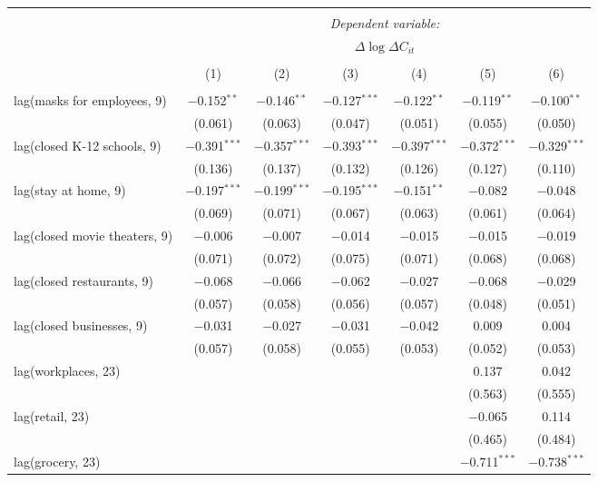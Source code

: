 \begin{tabular}{@{\extracolsep{1pt}}lcccccc} 
\\[-1.8ex]\hline 
\hline \\[-1.8ex] 
 & \multicolumn{6}{c}{\textit{Dependent variable:}} \\ 
\cline{2-7} 
 & \multicolumn{6}{c}{$\Delta \log \Delta C_{it}$} \\ 
\\[-1.8ex] & (1) & (2) & (3) & (4) & (5) & (6)\\ 
\hline \\[-1.8ex] 
 lag(masks for employees, 9) & $-$0.152$^{**}$ & $-$0.146$^{**}$ & $-$0.127$^{***}$ & $-$0.122$^{**}$ & $-$0.119$^{**}$ & $-$0.100$^{**}$ \\ 
  & (0.061) & (0.063) & (0.047) & (0.051) & (0.055) & (0.050) \\ 
  lag(closed K-12 schools, 9) & $-$0.391$^{***}$ & $-$0.357$^{***}$ & $-$0.393$^{***}$ & $-$0.397$^{***}$ & $-$0.372$^{***}$ & $-$0.329$^{***}$ \\ 
  & (0.136) & (0.137) & (0.132) & (0.126) & (0.127) & (0.110) \\ 
  lag(stay at home, 9) & $-$0.197$^{***}$ & $-$0.199$^{***}$ & $-$0.195$^{***}$ & $-$0.151$^{**}$ & $-$0.082 & $-$0.048 \\ 
  & (0.069) & (0.071) & (0.067) & (0.063) & (0.061) & (0.064) \\ 
  lag(closed movie theaters, 9) & $-$0.006 & $-$0.007 & $-$0.014 & $-$0.015 & $-$0.015 & $-$0.019 \\ 
  & (0.071) & (0.072) & (0.075) & (0.071) & (0.068) & (0.068) \\ 
  lag(closed restaurants, 9) & $-$0.068 & $-$0.066 & $-$0.062 & $-$0.027 & $-$0.068 & $-$0.029 \\ 
  & (0.057) & (0.058) & (0.056) & (0.057) & (0.048) & (0.051) \\ 
  lag(closed businesses, 9) & $-$0.031 & $-$0.027 & $-$0.031 & $-$0.042 & 0.009 & 0.004 \\ 
  & (0.057) & (0.058) & (0.055) & (0.053) & (0.052) & (0.053) \\ 
  lag(workplaces, 23) &  &  &  &  & 0.137 & 0.042 \\ 
  &  &  &  &  & (0.563) & (0.555) \\ 
  lag(retail, 23) &  &  &  &  & $-$0.065 & 0.114 \\ 
  &  &  &  &  & (0.465) & (0.484) \\ 
  lag(grocery, 23) &  &  &  &  & $-$0.711$^{***}$ & $-$0.738$^{***}$ \\ 

\end{tabular}
